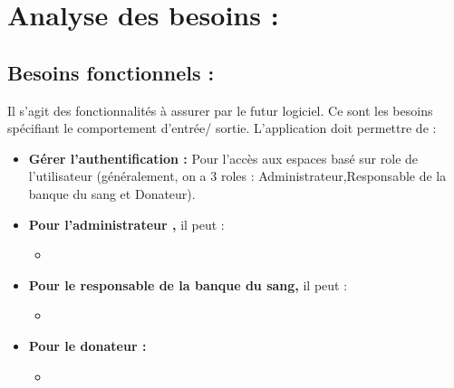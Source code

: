 \documentclass[12pt,a4paper,twoside]{report}
\begin{document}
	\section{Analyse des besoins :}{
			\subsection{Besoins fonctionnels :}{
				Il s’agit des fonctionnalités à assurer par le futur logiciel. Ce sont les besoins spécifiant le comportement d’entrée/ sortie. L’application doit permettre de :
				\begin{itemize}[label=\textbullet]
				\item \textbf{Gérer l’authentification :} Pour l’accès aux espaces basé sur role de l’utilisateur (généralement, on a 3 roles : Administrateur,Responsable de la banque du sang et Donateur).
				\item \textbf{Pour l'administrateur ,} il peut :
						\begin{itemize}
							\item 
						\end{itemize}
				\item \textbf{Pour le responsable de la banque du sang,} il peut :
						\begin{itemize}
								\item 
						\end{itemize}
				\item \textbf{Pour le donateur :}
						\begin{itemize}
								\item 
						\end{itemize}
			\end{itemize}
			}
}
\end{document}
